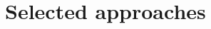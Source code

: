 \documentclass[runningheads]{llncs}\usepackage[]{graphicx}\usepackage[]{color}
\begin{document}







 





\section{Selected approaches}
\end{document}
